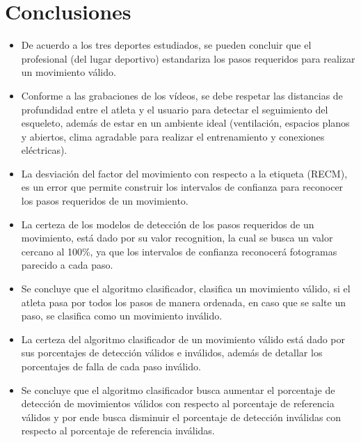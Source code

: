 \section{Conclusiones} \label{ded:con}
\begin{itemize}
\item De acuerdo a los tres deportes estudiados, se pueden concluir que el profesional (del lugar deportivo) estandariza los pasos requeridos para realizar un movimiento v\'alido.
\item Conforme a las grabaciones de los v\'ideos, se debe respetar las distancias de profundidad entre el atleta y el usuario para detectar el seguimiento del esqueleto, adem\'as de estar en un ambiente ideal (ventilaci\'on, espacios planos y  abiertos, clima agradable para realizar el entrenamiento y conexiones el\'ectricas).
\item La desviaci\'on del factor del movimiento con respecto a la etiqueta (RECM), es un error que  permite construir los intervalos de confianza para reconocer los pasos requeridos de un movimiento.
\item La certeza de los modelos de detecci\'on  de los pasos requeridos de un movimiento, est\'a dado por su valor recognition, la cual se busca un valor  cercano al 100\%, ya que los intervalos de confianza reconocer\'a fotogramas parecido a cada paso.
\item Se concluye que el algoritmo clasificador, clasifica un movimiento v\'alido, si el atleta pasa por todos los pasos de manera ordenada, en caso que se salte un paso, se clasifica como un movimiento inv\'alido.
\item La certeza del algoritmo clasificador de un movimiento v\'alido est\'a dado por sus porcentajes de detecci\'on v\'alidos e inv\'alidos, adem\'as de detallar los porcentajes de falla de cada paso inv\'alido.
\item Se concluye que el algoritmo clasificador busca aumentar el porcentaje de detecci\'on de movimientos v\'alidos con respecto al porcentaje de referencia v\'alidos y por ende busca disminuir el porcentaje de detecci\'on inv\'alidas con respecto al porcentaje de referencia inv\'alidas.
\end{itemize}